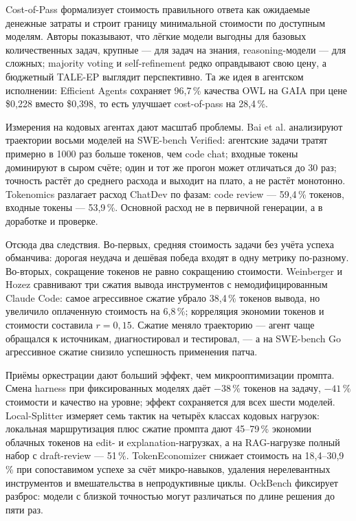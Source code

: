\documentclass[11pt,a4paper]{article}
\begin{document}
Cost-of-Pass \cite{erol2025costpass} формализует стоимость правильного
ответа как ожидаемые денежные затраты и строит границу минимальной
стоимости по доступным моделям. Авторы показывают, что лёгкие модели
выгодны для базовых количественных задач, крупные — для задач на знания,
reasoning-модели — для сложных; majority voting и self-refinement редко
оправдывают свою цену, а бюджетный TALE-EP выглядит перспективно. Та же
идея в агентском исполнении: Efficient Agents \cite{wang2025efficientagents}
сохраняет 96{,}7\,\% качества OWL на GAIA при цене \$0{,}228 вместо
\$0{,}398, то есть улучшает cost-of-pass на 28{,}4\,\%.

Измерения на кодовых агентах дают масштаб проблемы. Bai et al.
\cite{bai2026aiagents} анализируют траектории восьми моделей на SWE-bench
Verified: агентские задачи тратят примерно в 1000 раз больше токенов, чем
code chat; входные токены доминируют в сыром счёте; один и тот же прогон
может отличаться до 30 раз; точность растёт до среднего расхода и выходит
на плато, а не растёт монотонно. Tokenomics \cite{salim2026tokenomicsquantify}
разлагает расход ChatDev по фазам: code review — 59{,}4\,\% токенов,
входные токены — 53{,}9\,\%. Основной расход не в первичной генерации, а в
доработке и проверке.

Отсюда два следствия. Во-первых, средняя стоимость задачи без учёта успеха
обманчива: дорогая неудача и дешёвая победа входят в одну метрику
по-разному. Во-вторых, сокращение токенов не равно сокращению стоимости.
Weinberger и Hozez \cite{weinberger2026tokenreduction} сравнивают три
сжатия вывода инструментов с немодифицированным Claude Code: самое
агрессивное сжатие убрало 38{,}4\,\% токенов вывода, но увеличило
оплаченную стоимость на 6{,}8\,\%; корреляция экономии токенов и стоимости
составила $r=0{,}15$. Сжатие меняло траекторию — агент чаще обращался к
источникам, диагностировал и тестировал, — а на SWE-bench Go агрессивное
сжатие снизило успешность применения патча.

Приёмы оркестрации дают больший эффект, чем микрооптимизации промпта.
Смена harness при фиксированных моделях \cite{ali2026harnesseffect} даёт
$-38\,\%$ токенов на задачу, $-41\,\%$ стоимости и качество на уровне;
эффект сохраняется для всех шести моделей. Local-Splitter
\cite{agyemang2026localsplitter} измеряет семь тактик на четырёх классах
кодовых нагрузок: локальная маршрутизация плюс сжатие промпта дают
45--79\,\% экономии облачных токенов на edit- и explanation-нагрузках, а
на RAG-нагрузке полный набор с draft-review — 51\,\%. TokenEconomizer
\cite{li2026tokeneconomizerexp} снижает стоимость на 18{,}4--30{,}9\,\% при
сопоставимом успехе за счёт микро-навыков, удаления нерелевантных
инструментов и вмешательства в непродуктивные циклы. OckBench
\cite{du2025ockbenchmeasuring} фиксирует разброс: модели с близкой
точностью могут различаться по длине решения до пяти раз.
\end{document}
